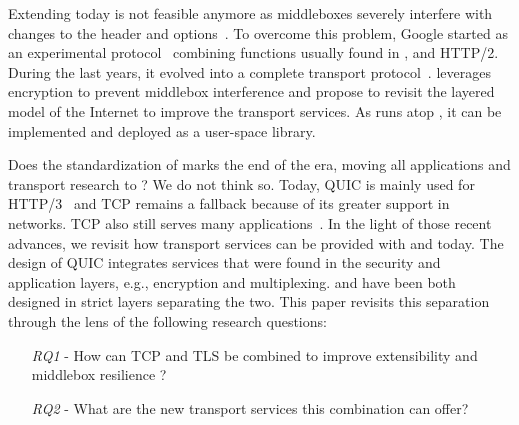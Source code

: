 Extending \tcp today is not feasible anymore as middleboxes severely interfere 
with changes to the \tcp header and 
options~\cite{medina2004measuring,honda2011still, edeline2019bottom}.
To overcome this problem, Google started \quic as an experimental 
protocol~\cite{roskind2013quic,langley2017quic} combining functions usually 
found in \tcp, \tls and HTTP/2. During the last years, it
evolved into a complete transport protocol~\cite{rfc9000}.
\quic leverages encryption to prevent middlebox interference and propose to 
revisit the layered model of the Internet to improve the transport services.
As \quic runs atop \udp, it can be implemented and deployed as a user-space library.

Does the standardization of \quic marks the end of the \tcp era, moving
all applications and transport research to \quic?  We do not think
so. Today, QUIC is mainly used for HTTP/3~\cite{http3} and TCP remains a 
fallback because of its greater support in networks. TCP also still serves many 
applications~\cite{covid19,fiveyears}.
%
In the light of those recent advances, we revisit how transport services can be
provided with \tcp and \tls today. The design of QUIC integrates services
that were found in the security and application layers, e.g., encryption and multiplexing.
\tcp and \tls have been both designed in strict layers separating the two.
This paper revisits this separation through the lens of the following research questions:

\begin{itemize}
	\item[{\small{\textit{RQ1}}} -] How can TCP and TLS be 
	combined to improve extensibility and middlebox resilience ?
	\item[{\small{\textit{RQ2}}} -] What are the new transport services this 
	combination can offer?
\end{itemize}

